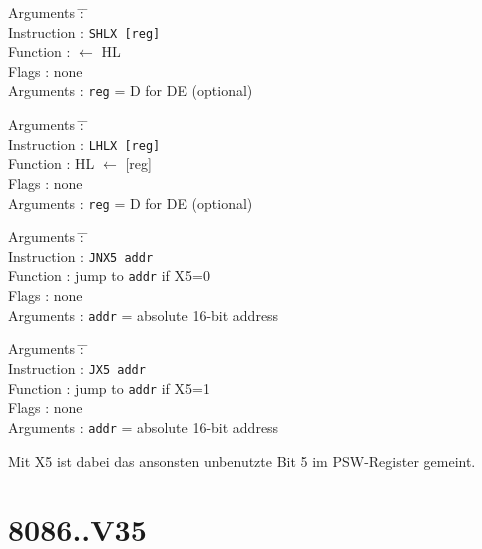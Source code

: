 \documentclass[12pt,twoside]{report}
\newcommand{\tty}[1]{{\tt #1}}
\begin{document}
\begin{tabbing}
Arguments         \= : \= \kill \\
Instruction       \> : \> \tty{SHLX [reg]} \\
Function          \> : \> [reg] $\leftarrow$ HL \\
Flags             \> : \> none \\
Arguments         \> : \> \tty{reg} = D for DE (optional) \\
\end{tabbing}

\begin{tabbing}
Arguments         \= : \= \kill \\
Instruction       \> : \> \tty{LHLX [reg]} \\
Function          \> : \> HL $\leftarrow$ [reg] \\
Flags             \> : \> none \\
Arguments         \> : \> \tty{reg} = D for DE (optional) \\
\end{tabbing}

\begin{tabbing}
Arguments         \= : \= \kill \\
Instruction       \> : \> \tty{JNX5 addr} \\
Function          \> : \> jump to {\tt addr} if X5=0 \\
Flags             \> : \> none \\
Arguments         \> : \> {\tt addr} = absolute 16-bit address \\
\end{tabbing}

\begin{tabbing}
Arguments         \= : \= \kill \\
Instruction       \> : \> \tty{JX5 addr} \\
Function          \> : \> jump to {\tt addr} if X5=1 \\
Flags             \> : \> none \\
Arguments         \> : \> {\tt addr} = absolute 16-bit address \\ 
\end{tabbing}

Mit X5 ist dabei das ansonsten unbenutzte Bit 5 im PSW-Register gemeint.


\section{8086..V35}
\end{document}

